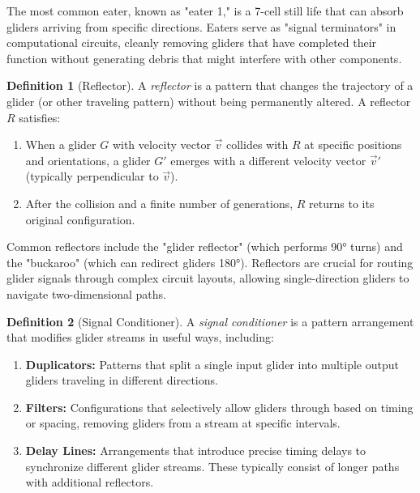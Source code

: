 \documentclass{article}
\theoremstyle{definition}
\newtheorem{definition}{Definition}[section]
\theoremstyle{plain}
\theoremstyle{plain}
\begin{document}
The most common eater, known as "eater 1," is a 7-cell still life that can absorb gliders arriving from specific directions. Eaters serve as "signal terminators" in computational circuits, cleanly removing gliders that have completed their function without generating debris that might interfere with other components.

\begin{definition}[Reflector]
A \textit{reflector} is a pattern that changes the trajectory of a glider (or other traveling pattern) without being permanently altered. A reflector $R$ satisfies:
\begin{enumerate}
  \item When a glider $G$ with velocity vector $\vec{v}$ collides with $R$ at specific positions and orientations, a glider $G'$ emerges with a different velocity vector $\vec{v}'$ (typically perpendicular to $\vec{v}$).
  \item After the collision and a finite number of generations, $R$ returns to its original configuration.
\end{enumerate}
\end{definition}

Common reflectors include the "glider reflector" (which performs 90° turns) and the "buckaroo" (which can redirect gliders 180°). Reflectors are crucial for routing glider signals through complex circuit layouts, allowing single-direction gliders to navigate two-dimensional paths.

\begin{definition}[Signal Conditioner]
A \textit{signal conditioner} is a pattern arrangement that modifies glider streams in useful ways, including:
\begin{enumerate}
  \item \textbf{Duplicators:} Patterns that split a single input glider into multiple output gliders traveling in different directions.
  \item \textbf{Filters:} Configurations that selectively allow gliders through based on timing or spacing, removing gliders from a stream at specific intervals.
  \item \textbf{Delay Lines:} Arrangements that introduce precise timing delays to synchronize different glider streams. These typically consist of longer paths with additional reflectors.
\end{enumerate}
\end{definition}
\end{document}
